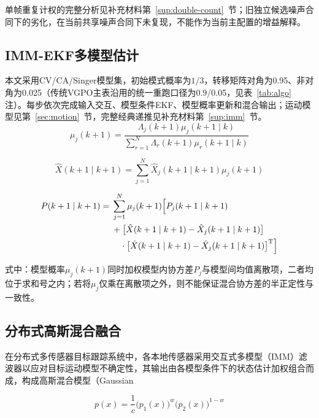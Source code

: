 \documentclass[UTF8,a4paper,zihao=-4]{ctexart}
\begin{document}
单帧重复计权的完整分析见补充材料第~\ref{sup:double-count}~节；旧独立候选噪声合同下的劣化，在当前共享噪声合同下未复现，不能作为当前主配置的增益解释。


\subsection{IMM-EKF多模型估计}\label{sec:imm}
本文采用CV/CA/Singer模型集，初始模式概率为\(1/3\)，转移矩阵对角为0.95、非对角为0.025（传统VGPO主表沿用的统一重跑口径为0.9/0.05，见表~\ref{tab:algo} 注）。每步依次完成输入交互、模型条件EKF、模型概率更新和混合输出；运动模型见第~\ref{sec:motion}~节，完整经典递推见补充材料第~\ref{sup:imm}~节。
\begin{equation}
\mu_j(k+1)=\frac{\Lambda_j(k+1)\mu_j(k+1\mid k)}{\sum_{r=1}^{N}\Lambda_r(k+1)\mu_r(k+1\mid k)}
\label{eq:word-62}
\end{equation}

\begin{equation}
\hat{X}(k+1\mid k+1)=\sum_{j=1}^{N}\hat{X}_j(k+1\mid k+1)\mu_j(k+1)
\label{eq:word-66}
\end{equation}

\begin{equation}
\begin{aligned}
P(k+1\mid k+1)={}&\sum_{j=1}^{N}\mu_j(k+1)\Bigl[P_j(k+1\mid k+1)\\
&+\bigl[\hat{X}(k+1\mid k+1)-\hat{X}_j(k+1\mid k+1)\bigr]\\
&\quad\cdot\bigl[\hat{X}(k+1\mid k+1)-\hat{X}_j(k+1\mid k+1)\bigr]^{\mathrm T}\Bigr]
\end{aligned}
\label{eq:word-67}
\end{equation}

式中：模型概率\(\mu_j(k+1)\)同时加权模型内协方差\(P_j\)与模型间均值离散项，二者均位于求和号之内；若将\(\mu_j\)仅乘在离散项之外，则不能保证混合协方差的半正定性与一致性。



\subsection{分布式高斯混合融合}\label{sec:fusion}
在分布式多传感器目标跟踪系统中，各本地传感器采用交互式多模型（IMM）滤波器以应对目标运动模型不确定性，其输出由各模型条件下的状态估计加权组合而成，构成高斯混合模型（Gaussian

\begin{equation}
p(x)=\frac1c\bigl(p_1(x)\bigr)^w\bigl(p_2(x)\bigr)^{1-w}
\label{eq:word-75}
\end{equation}
\end{document}
